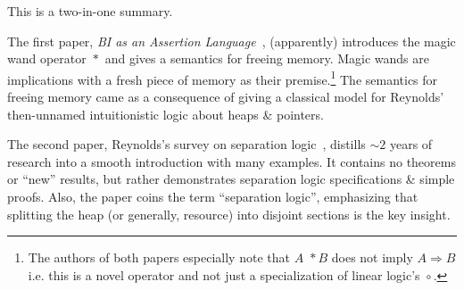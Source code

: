 \documentclass{article}
\begin{document}

This is a two-in-one summary.

The first paper, \emph{BI as an Assertion Language}~\cite{i-bi}, (apparently) introduces the magic wand operator \textemdash$\!*$ and gives a semantics for freeing memory.
Magic wands are implications with a fresh piece of memory as their premise.\footnote{The authors of both papers especially note that $A$ \textemdash$\!* B$ does not imply $A \Rightarrow B$ i.e. this is a novel operator and not just a specialization of linear logic's \textemdash$\!\circ$.}
The semantics for freeing memory came as a consequence of giving a classical model for Reynolds' then-unnamed intuitionistic logic about heaps \& pointers.

The second paper, Reynolds's survey on separation logic~\cite{r-separation}, distills $\sim\!2$ years of research into a smooth introduction with many examples.
It contains no theorems or ``new'' results, but rather demonstrates separation logic specifications \& simple proofs.
Also, the paper coins the term ``separation logic'', emphasizing that splitting the heap (or generally, resource) into disjoint sections is the key insight.
\end{document}
